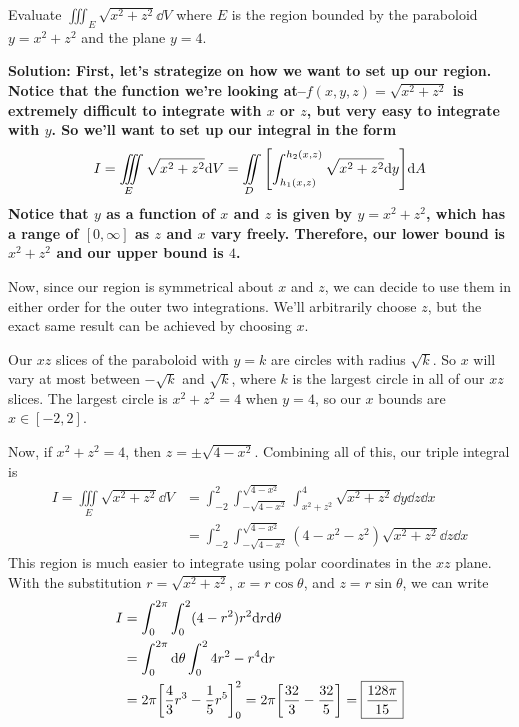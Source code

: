 \begin{example}
    Evaluate $\iiint_E \sqrt{x^2+z^2}\dd V$ where $E$ is the region bounded by the paraboloid $y=x^2+z^2$ and the plane $y=4$.\par
    \bf{Solution}: First, let's strategize on how we want to set up our region. Notice that the function we're looking at--$f(x,y,z) = \sqrt{x^2+z^2}$ is extremely difficult to integrate with $x$ or $z$, but very easy to integrate with $y$. So we'll want to set up our integral in the form
    \[ I = \iiint\limits_E \sqrt{x^2+z^2}\dd V = \iint\limits_D \bqty{\int_{h_1(x,z)}^{h_2(x,z)}\sqrt{x^2+z^2}\dd y}\dd A \]
    Notice that $y$ as a function of $x$ and $z$ is given by $y=x^2+z^2$, which has a range of $[0, \infty]$ as $z$ and $x$ vary freely. Therefore, our lower bound is $x^2+z^2$ and our upper bound is $4$. \par
    Now, since our region is symmetrical about $x$ and $z$, we can decide to use them in either order for the outer two integrations. We'll arbitrarily choose $z$, but the exact same result can be achieved by choosing $x$. \par
    Our $xz$ slices of the paraboloid with $y=k$ are circles with radius $\sqrt{k}$. So $x$ will vary at most between $-\sqrt{k}$ and $\sqrt{k}$, where $k$ is the largest circle in all of our $xz$ slices. The largest circle is $x^2+z^2=4$ when $y=4$, so our $x$ bounds are $x\in[-2, 2]$. \par
    Now, if $x^2+z^2=4$, then $z=\pm \sqrt{4-x^2}$. Combining all of this, our triple integral is
    \begin{align*}
        I = \iiint\limits_E \sqrt{x^2+z^2}\dd V &= \int_{-2}^2\int_{-\sqrt{4-x^2}}^{\sqrt{4-x^2}}\int_{x^2+z^2}^4 \sqrt{x^2+z^2}\dd y\dd z\dd x \\
        &= \int_{-2}^2 \int_{-\sqrt{4-x^2}}^{\sqrt{4-x^2}}(4-x^2-z^2)\sqrt{x^2+z^2}\dd z \dd x
    \end{align*}
    This region is much easier to integrate using polar coordinates in the $xz$ plane. With the substitution $r=\sqrt{x^2+z^2}$, $x=r\cos\theta$, and $z=r\sin\theta$, we can write
    \begin{align*}
        I &= \int_{0}^{2\pi}\int_0^2 (4-r^2)r^2\dd r\dd \theta \\
        &= \int_{0}^{2\pi}\dd \theta \int_0^2 4r^2-r^4\dd r \\
        &= 2\pi \bqty{\frac{4}{3}r^3-\frac{1}{5}r^5}_0^2 = 2\pi \bqty{\frac{32}{3} - \frac{32}{5}} = \boxed{\frac{128\pi}{15}}
    \end{align*}
\end{example}

